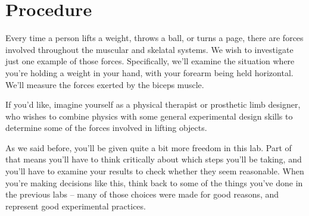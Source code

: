 \documentclass[11pt,letterpaper]{article}
\newcommand{\temp}[2][]{#1#2}
\begin{document}
\temp{\clearpage}
\section*{Procedure}
Every time a person lifts a weight, throws a ball, or turns a page,
there are forces involved throughout the muscular and skelatal systems.
We wish to investigate just one example of those forces.
Specifically, we'll examine the situation where you're holding a weight in your
hand, with your forearm being held horizontal.
We'll measure the forces exerted by the biceps muscle.

If you'd like, imagine yourself as a 
physical therapist or prosthetic limb designer,
who wishes to combine physics with some 
general experimental design skills to determine 
some of the forces involved in lifting objects.


As we said before, you'll be given quite a bit more freedom in this lab.
Part of that means you'll have to think critically about 
which steps you'll be taking, and you'll have to examine your results to 
check whether they seem reasonable.  
When you're making decisions like this, think back to some of the things
you've done in the previous labs -- many of those choices were made 
for good reasons, and represent good experimental practices.
\end{document}
